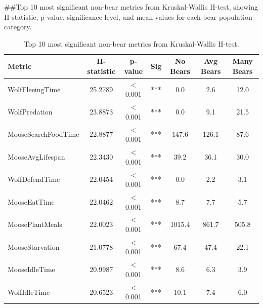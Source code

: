 
##Top 10 most significant non-bear metrics from Kruskal-Wallis H-test, showing H-statistic, p-value, significance level, and mean values for each bear population category.

\begin{table}[htbp]
\centering
\caption{Top 10 most significant non-bear metrics from Kruskal-Wallis H-test.}
\label{tab:significance_top10_nonbear}
\small
\begin{tabular}{lcccccc}
\toprule
\textbf{Metric} & \textbf{H-statistic} & \textbf{p-value} & \textbf{Sig} & \textbf{No Bears} & \textbf{Avg Bears} & \textbf{Many Bears} \\
\midrule
WolfFleeingTime & 25.2789 & < 0.001 & *** & 0.0 & 2.6 & 12.0 \\
WolfPredation & 23.8873 & < 0.001 & *** & 0.0 & 9.1 & 21.5 \\
MooseSearchFoodTime & 22.8877 & < 0.001 & *** & 147.6 & 126.1 & 87.6 \\
MooseAvgLifespan & 22.3430 & < 0.001 & *** & 39.2 & 36.1 & 30.0 \\
WolfDefendTime & 22.0454 & < 0.001 & *** & 0.0 & 2.2 & 3.1 \\
MooseEatTime & 22.0462 & < 0.001 & *** & 8.7 & 7.7 & 5.7 \\
MoosePlantMeals & 22.0023 & < 0.001 & *** & 1015.4 & 861.7 & 505.8 \\
MooseStarvation & 21.0778 & < 0.001 & *** & 67.4 & 47.4 & 22.1 \\
MooseIdleTime & 20.9987 & < 0.001 & *** & 8.6 & 6.3 & 3.9 \\
WolfIdleTime & 20.6523 & < 0.001 & *** & 10.1 & 7.4 & 6.0 \\
\bottomrule
\end{tabular}
\end{table}
